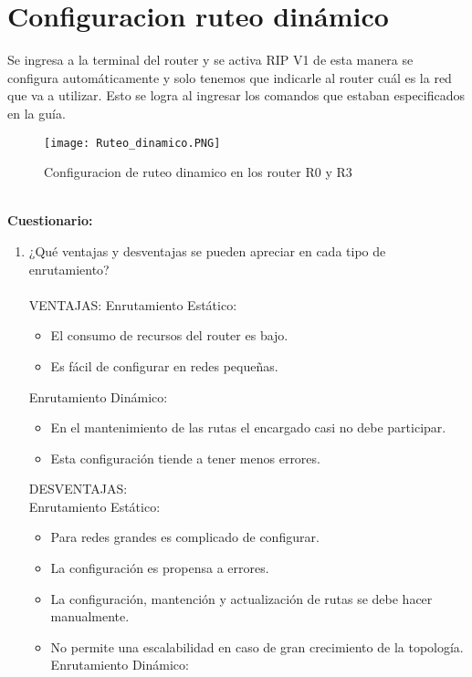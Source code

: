 \documentclass{udpreport}
\begin{document}
	\section{Configuracion ruteo dinámico}
	Se ingresa a la terminal del router y se activa RIP V1 de esta manera se configura automáticamente y solo tenemos que
	indicarle al router cuál es la red que va a utilizar. Esto se logra al ingresar los comandos que estaban especificados en la
	guía.\\
	\begin{figure}[H]
	\centering
	\texttt{[image: Ruteo\_dinamico.PNG]}
	\caption{Configuracion de ruteo dinamico en los router R0 y R3}
	\end{figure}\\
{\large \bf{Cuestionario: }}\\
	\begin{enumerate}
	    \item ¿Qué ventajas y desventajas se pueden apreciar en cada tipo de enrutamiento?\\\\
	    VENTAJAS:
	    Enrutamiento Estático:\\
	    \begin{itemize}
	    	\item El consumo de recursos del router es bajo.
	    	\item Es fácil de configurar en redes pequeñas.
	    \end{itemize}
	    Enrutamiento Dinámico:\\
	    \begin{itemize}
	    	\item En el mantenimiento de las rutas el encargado casi no debe participar.
	    	\item Esta configuración tiende a tener menos errores.
	    \end{itemize}
	    DESVENTAJAS:\\
	    Enrutamiento Estático:\\
	    \begin{itemize}
	    	\item Para redes grandes es complicado de configurar.
	    	\item La configuración es propensa a errores.
	    	\item La configuración, mantención y actualización de rutas se debe hacer manualmente.
	    	\item No permite una escalabilidad en caso de gran crecimiento de la topología.
	    Enrutamiento Dinámico:\\

\end{itemize}
\end{enumerate}
\end{document}
